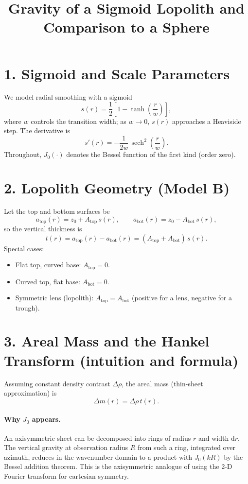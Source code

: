 \documentclass[11pt,a4paper]{article}
\begin{document}
\title{Gravity of a Sigmoid Lopolith and Comparison to a Sphere}
\author{}
\date{}
\maketitle

\section*{1. Sigmoid and Scale Parameters}

We model radial smoothing with a sigmoid
\[
s(r) = \frac12 \left[ 1 - \tanh\!\left( \frac{r}{w} \right) \right],
\]
where $w$ controls the transition width; as $w \to 0$, $s(r)$ approaches a Heaviside step. The derivative is
\[
s'(r) = -\frac{1}{2w}\,\operatorname{sech}^2\!\left(\frac{r}{w}\right).
\]
Throughout, $J_0(\cdot)$ denotes the Bessel function of the first kind (order zero).

\section*{2. Lopolith Geometry (Model B)}

Let the top and bottom surfaces be
\[
a_{\mathrm{top}}(r) = z_0 + A_{\mathrm{top}}\, s(r), 
\qquad
a_{\mathrm{bot}}(r) = z_0 - A_{\mathrm{bot}}\, s(r),
\]
so the vertical thickness is
\[
t(r) = a_{\mathrm{top}}(r) - a_{\mathrm{bot}}(r)
= (A_{\mathrm{top}} + A_{\mathrm{bot}})\, s(r).
\]
Special cases:
\begin{itemize}
\item Flat top, curved base: $A_{\mathrm{top}} = 0$.
\item Curved top, flat base: $A_{\mathrm{bot}} = 0$.
\item Symmetric lens (lopolith): $A_{\mathrm{top}} = A_{\mathrm{bot}}$ (positive for a lens, negative for a trough).
\end{itemize}

\section*{3. Areal Mass and the Hankel Transform (intuition and formula)}

Assuming constant density contrast $\Delta\rho$, the areal mass (thin-sheet approximation) is
\[
\Delta m(r) = \Delta\rho\, t(r).
\]

\paragraph{Why $J_0$ appears.}
An axisymmetric sheet can be decomposed into rings of radius $r$ and width $\mathrm{d}r$.
The vertical gravity at observation radius $R$ from such a ring, integrated over azimuth, reduces in the wavenumber domain to a product with $J_0(kR)$ by the Bessel addition theorem. This is the axisymmetric analogue of using the 2-D Fourier transform for cartesian symmetry.
\end{document}

